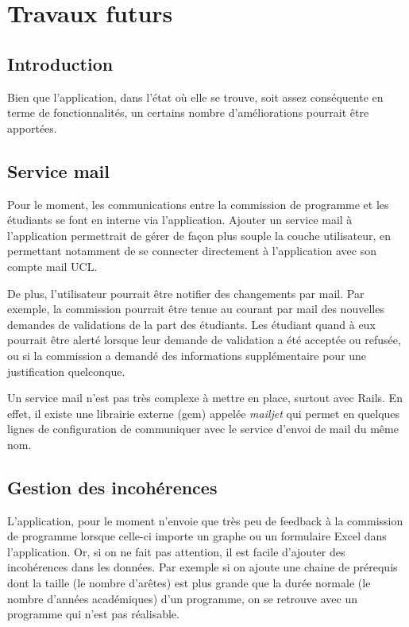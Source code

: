 \chapter{Travaux futurs}
\label{futur_work}
\section{Introduction}
Bien que l’application, dans l'état où elle se trouve, soit assez conséquente en terme de fonctionnalités, un certains nombre d'améliorations pourrait être apportées. 

\section{Service mail}
Pour le moment, les communications entre la commission de programme et les étudiants se font en interne via l'application. Ajouter un service mail à l'application permettrait de gérer de façon plus souple la couche utilisateur, en permettant notamment de se connecter directement à l'application avec son compte mail UCL.

De plus, l'utilisateur pourrait être notifier des changements par mail. Par exemple, la commission pourrait être tenue au courant par mail des nouvelles demandes de validations de la part des étudiants. Les étudiant quand à eux pourrait être alerté lorsque leur demande de validation a été acceptée ou refusée, ou si la commission a demandé des informations supplémentaire pour une justification quelconque. 

Un service mail n'est pas très complexe à mettre en place, surtout avec Rails. En effet, il existe une librairie externe (gem) appelée \textit{mailjet} qui permet en quelques lignes de configuration de communiquer avec le service d'envoi de mail du même nom. 
\section{Gestion des incohérences}

L'application, pour le moment n'envoie que très peu de feedback à la commission de programme lorsque celle-ci importe un graphe ou un formulaire Excel dans l'application. Or, si on ne fait pas attention, il est facile d'ajouter des incohérences dans les données. Par exemple si on ajoute une chaine de prérequis dont la taille (le nombre d’arêtes) est plus grande que la durée normale (le nombre d'années académiques) d'un programme, on se retrouve avec un programme qui n'est pas réalisable.

